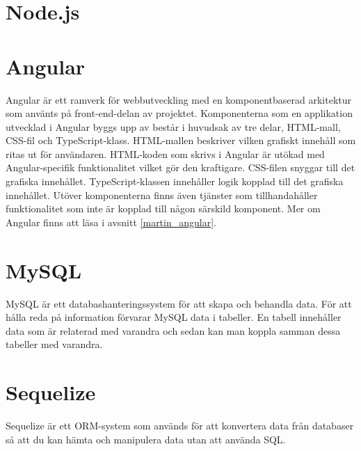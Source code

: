 \section{Node.js}

\section{Angular}
Angular är ett ramverk för webbutveckling med en komponentbaserad arkitektur som använts på front-end-delan av projektet. Komponenterna som en applikation utvecklad i Angular byggs upp av består i huvudsak av tre delar, HTML-mall, CSS-fil och TypeScript-klass. 
HTML-mallen beskriver vilken grafiskt innehåll som ritas ut för användaren. HTML-koden som skrivs i Angular är utökad med Angular-specifik funktionalitet vilket gör den kraftigare.  
CSS-filen snyggar till det grafiska innehållet.
TypeScript-klassen innehåller logik kopplad till det grafiska innehållet.
Utöver komponenterna finns även tjänster som tillhandahåller funktionalitet som inte är kopplad till någon särskild komponent. Mer om Angular finns att läsa i avsnitt \ref{martin_angular}.
 
\section{MySQL}
MySQL är ett databashanteringssystem för att skapa och behandla data. För att hålla reda på information förvarar MySQL data i tabeller. En tabell innehåller data som är relaterad med varandra och sedan kan man koppla samman dessa tabeller med varandra.
\cite{mysql}

\section{Sequelize}
Sequelize är ett ORM-system som används för att konvertera data från databaser så att du kan hämta och manipulera data utan att använda SQL.
\cite{sequelize}
